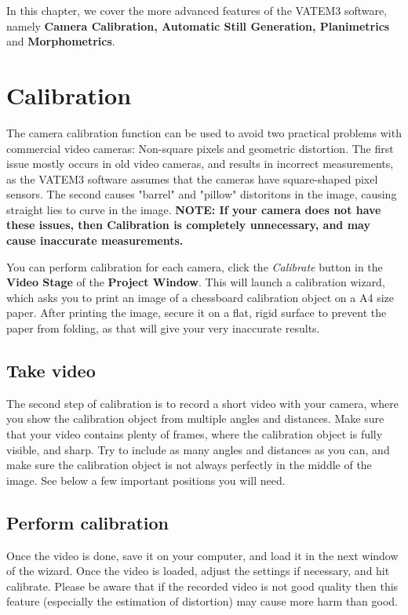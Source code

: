 \documentclass[10pt,a4paper,oneside]{report}             %
\begin{document}
In this chapter, we cover the more advanced features of the VATEM3 software, namely \textbf{Camera Calibration, Automatic Still Generation, Planimetrics} and \textbf{Morphometrics}.

\section{Calibration}

The camera calibration function can be used to avoid two practical problems with commercial video cameras: Non-square pixels and geometric distortion. The first issue mostly occurs in old video cameras, and results in incorrect measurements, as the VATEM3 software assumes that the cameras have square-shaped pixel sensors. The second causes "barrel" and "pillow" distoritons in the image, causing straight lies to curve in the image. \textbf{NOTE: If your camera does not have these issues, then Calibration is completely unnecessary, and may cause inaccurate measurements.}

You can perform calibration for each camera, click the \textit{Calibrate} button in the \textbf{Video Stage} of the \textbf{Project Window}. This will launch a calibration wizard, which asks you to print an image of a chessboard calibration object on a A4 size paper. After printing the image, secure it on a flat, rigid surface to prevent the paper from folding, as that will give your very inaccurate results.

\subsection{Take video}

The second step of calibration is to record a short video with your camera, where you show the calibration object from multiple angles and distances. Make sure that your video contains plenty of frames, where the calibration object is fully visible, and sharp. Try to include as many angles and distances as you can, and make sure the calibration object is not always perfectly in the middle of the image. See below a few important positions you will need. 

\subsection{Perform calibration}

Once the video is done, save it on your computer, and load it in the next window of the wizard. Once the video is loaded, adjust the settings if necessary, and hit calibrate. Please be aware that if the recorded video is not good quality then this feature (especially the estimation of distortion) may cause more harm than good.
\end{document}
